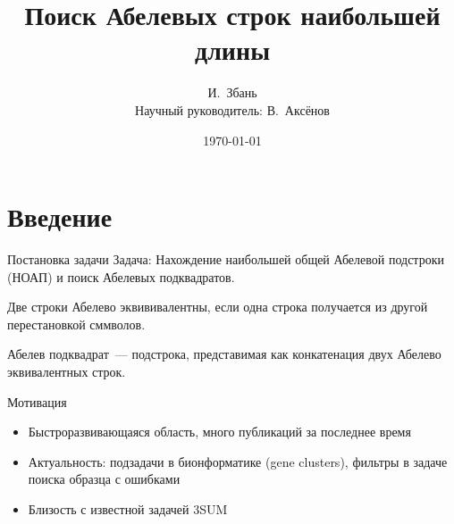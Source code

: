 \documentclass[hyperref=unicode,graphics=pdflatex,12pt]{beamer}
\begin{document}
\title{Поиск Абелевых строк наибольшей длины}
\author{И.~Збань\\
Научный руководитель: В.~Аксёнов}

\date{\today}
\frame{\titlepage}                                   

\section{Введение}

\begin{frame}{Постановка задачи}
\hspace{0.5cm}
Задача: Нахождение наибольшей общей Абелевой подстроки (НОАП) и поиск Абелевых подквадратов.

\vspace{0.5cm}
\hspace{0.5cm}
Две строки Абелево эквививалентны, если одна строка получается из другой перестановкой сммволов.

\vspace{0.5cm}
\hspace{0.5cm}
Абелев подквадрат~--- подстрока, представимая как конкатенация двух Абелево эквивалентных строк.
\end{frame}


\begin{frame}{Мотивация}
\hspace{0.5cm}
\begin{itemize}
\item<1-> Быстроразвивающаяся область, много публикаций за последнее время
\item<2-> Актуальность: подзадачи в бионформатике (gene clusters), фильтры в задаче поиска образца с ошибками
\item<3-> Близость с известной задачей 3SUM
\end{itemize}
\end{frame}
\end{document}
